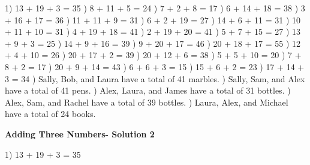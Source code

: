 \documentclass{article}%
\begin{document}
1) 13 + 19 + 3 = 35%
) 8 + 11 + 5 = 24%
) 7 + 2 + 8 = 17%
) 6 + 14 + 18 = 38%
) 3 + 16 + 17 = 36%
) 11 + 11 + 9 = 31%
) 6 + 2 + 19 = 27%
) 14 + 6 + 11 = 31%
) 10 + 11 + 10 = 31%
) 4 + 19 + 18 = 41%
) 2 + 19 + 20 = 41%
) 5 + 7 + 15 = 27%
) 13 + 9 + 3 = 25%
) 14 + 9 + 16 = 39%
) 9 + 20 + 17 = 46%
) 20 + 18 + 17 = 55%
) 12 + 4 + 10 = 26%
) 20 + 17 + 2 = 39%
) 20 + 12 + 6 = 38%
) 5 + 5 + 10 = 20%
) 7 + 8 + 2 = 17%
) 20 + 9 + 14 = 43%
) 6 + 6 + 3 = 15%
) 15 + 6 + 2 = 23%
) 17 + 14 + 3 = 34%
) Sally, Bob, and Laura have a total of 41 marbles.%
) Sally, Sam, and Alex have a total of 41 pens.%
) Alex, Laura, and James have a total of 31 bottles.%
) Alex, Sam, and Rachel have a total of 39 bottles.%
) Laura, Alex, and Michael have a total of 24 books.%
\newline%
\newpage%
\large%
\begin{center}%
\textbf{Adding Three Numbers- Solution 2}%
\newline%
\end{center} \normalsize%
1) 13 + 19 + 3 = 35%
\newline%
\end{document}

